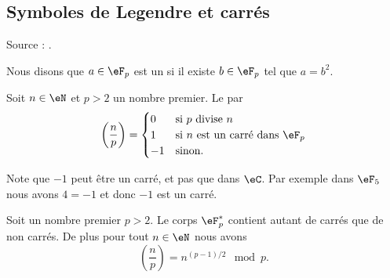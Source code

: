\subsection{Symboles de Legendre et carrés}

Source : \cite{RecQuadVento}.

Nous disons que \( a\in \eF_p\) est un  si il existe \( b\in \eF_p\) tel que \( a=b^2\).

\begin{definition}
    Soit \( n\in \eN\) et \( p>2\) un nombre premier. Le  par
    \begin{equation}
        \left( \frac{ n }{ p } \right)=\begin{cases}
            0    &   \text{si \( p\) divise \( n\)}\\
            1    &    \text{si \( n\) est un carré dans \( \eF_p\)}\\
            -1    &    \text{sinon}.
        \end{cases}
    \end{equation}
\end{definition}

Note que \( -1\) peut être un carré, et pas que dans \( \eC\). Par exemple dans \( \eF_5\) nous avons \( 4=-1\) et donc \( -1\) est un carré.

\begin{proposition} \label{PropcGsJjk}
    Soit un nombre premier \( p>2\). Le corps \( \eF_p^*\) contient autant de carrés que de non carrés. De plus pour tout \( n\in \eN\) nous avons
    \begin{equation}    \label{Eqbcugos}
        \left(\frac{n}{p}\right)=n^{(p-1)/2}\mod p.
    \end{equation}
\end{proposition}

